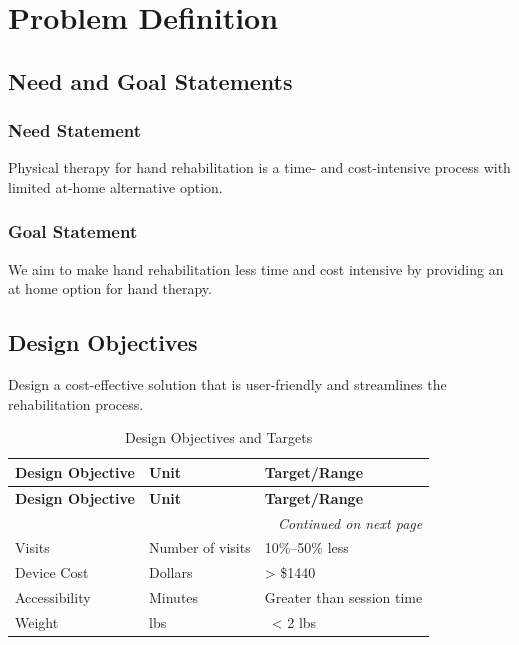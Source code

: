 \documentclass{article}
\begin{document}
\section{Problem Definition}

\subsection{Need and Goal Statements}
\subsubsection{Need Statement}
Physical therapy for hand rehabilitation is a time- and cost-intensive process with limited at-home alternative option.
\subsubsection{Goal Statement}
We aim to make hand rehabilitation less time and cost intensive by providing an at home option for hand therapy.

\subsection{Design Objectives}
Design a cost-effective solution that is user-friendly and streamlines the rehabilitation process.
\begin{longtable}{|l|l|l|}
    \caption{Design Objectives and Targets} \label{tab:design_objectives} \\
    \hline
    \textbf{Design Objective} & \textbf{Unit} & \textbf{Target/Range} \\ \hline
    \endfirsthead

    \hline
    \textbf{Design Objective} & \textbf{Unit} & \textbf{Target/Range} \\ \hline
    \endhead

    \hline
    \multicolumn{3}{|r|}{\textit{Continued on next page}} \\ \hline
    \endfoot

    \hline
    \endlastfoot

    Visits & Number of visits & 10\%--50\% less \\ \hline
    Device Cost & Dollars & \textgreater{} \$1440 \\ \hline
    Accessibility & Minutes & Greater than session time \\ \hline
    Weight & lbs & \ \textless{} 2 lbs \\ \hline
\end{longtable}
\end{document}
